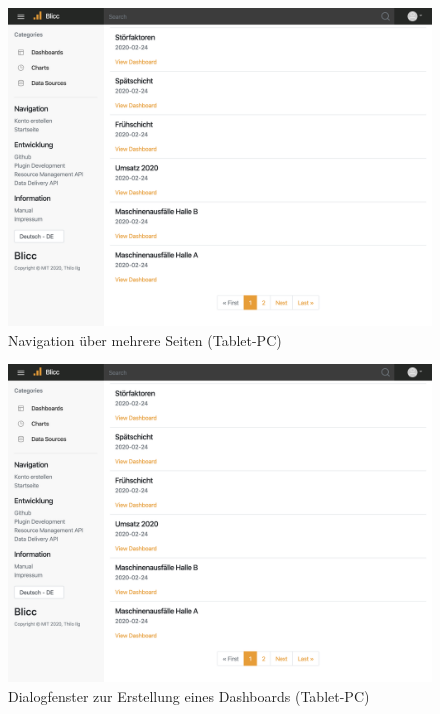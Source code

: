 \begin{figure}[h]
    \centering
    \includegraphics[scale=0.35]{img/tablet/Pagination}
    \caption{Navigation über mehrere Seiten (Tablet-PC)}
    \label{figure:navigationuebermehrereseiten}
\end{figure}

\begin{figure}[h]
    \centering
    \includegraphics[scale=0.35]{img/tablet/Pagination}
    \caption{Dialogfenster zur Erstellung eines Dashboards (Tablet-PC)}
    \label{figure:dialogfensterzurerstellungeinesdashboards}
\end{figure}
